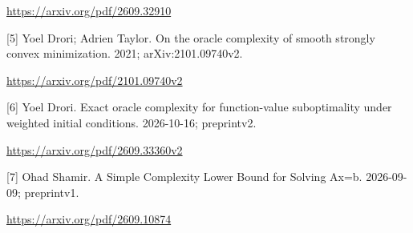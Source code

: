 \documentclass[10pt,a4paper]{article}
\begin{document}
\url{https://arxiv.org/pdf/2609.32910}

[5] Yoel Drori; Adrien Taylor. On the oracle complexity of smooth strongly convex minimization. 2021; arXiv:2101.09740v2.

\url{https://arxiv.org/pdf/2101.09740v2}

[6] Yoel Drori. Exact oracle complexity for function-value suboptimality under weighted initial conditions. 2026-10-16; preprintv2.

\url{https://arxiv.org/pdf/2609.33360v2}

[7] Ohad Shamir. A Simple Complexity Lower Bound for Solving Ax=b. 2026-09-09; preprintv1.

\url{https://arxiv.org/pdf/2609.10874}
\end{document}
